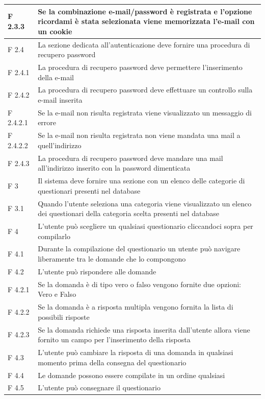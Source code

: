 \documentclass[a4paper,11pt]{article}
\begin{document}
\begin{longtable}{p{}p{}}
\midrule
F 2.3.3 & Se la combinazione e-mail/password è registrata e l'opzione ricordami è stata selezionata viene memorizzata l'e-mail con un cookie\\
\midrule
F 2.4 & La sezione dedicata all'autenticazione deve fornire una procedura di recupero password\\
\midrule
F 2.4.1 & La procedura di recupero password deve permettere l'inserimento della e-mail\\
\midrule
F 2.4.2 & La procedura di recupero password deve effettuare un controllo sulla e-mail inserita\\
\midrule
F 2.4.2.1 & Se la e-mail non risulta registrata viene visualizzato un messaggio di errore\\
\midrule
F 2.4.2.2 & Se la e-mail non risulta registrata non viene mandata una mail a quell'indirizzo\\
\midrule
F 2.4.3 & La procedura di recupero password deve mandare una mail all'indirizzo inserito con la password dimenticata\\
\midrule
F 3 & Il sistema deve fornire una sezione con un elenco delle categorie di questionari presenti nel database\\
\midrule
F 3.1 & Quando l'utente seleziona una categoria viene visualizzato un elenco dei questionari della categoria scelta presenti nel database\\
\midrule
F 4 & L'utente può scegliere un qualsiasi questionario cliccandoci sopra per compilarlo\\
\midrule
F 4.1 & Durante la compilazione del questionario un utente può navigare liberamente tra le domande che lo compongono\\
\midrule
F 4.2 & L'utente può rispondere alle domande\\
\midrule
F 4.2.1 & Se la domanda è di tipo vero o falso vengono fornite due opzioni: Vero e Falso\\
\midrule
F 4.2.2 & Se la domanda è a risposta multipla vengono fornita la lista di possibili risposte\\
\midrule
F 4.2.3 & Se la domanda richiede una risposta inserita dall'utente allora viene fornito un campo per l'inserimento della risposta\\
\midrule
F 4.3 & L'utente può cambiare la risposta di una domanda in qualsiasi momento prima della consegna del questionario\\
\midrule
F 4.4 & Le domande possono essere compilate in un ordine qualsiasi\\
\midrule
F 4.5 & L'utente può consegnare il questionario\\

\end{longtable}
\end{document}

